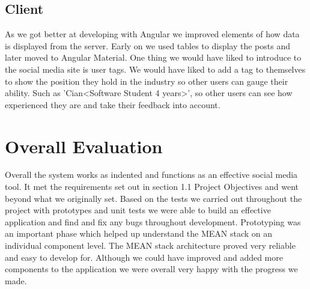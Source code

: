 \subsection{Client}
As we got better at developing with Angular we improved elements of how data is displayed from the server. Early on we used tables to display the posts and later moved to Angular Material. One thing we would have liked to introduce to the social media site is user tags. We would have liked to add a tag to themselves to show the position they hold in the industry so other users can gauge their ability. Such as 'Cian<Software Student 4 years>', so other users can see how experienced they are and take their feedback into account.


\section{Overall Evaluation}
Overall the system works as indented and functions as an effective social media tool. It met the requirements set out in section 1.1 Project Objectives and went beyond what we originally set. Based on the tests we carried out throughout the project with prototypes and unit tests we were able to build an effective application and find and fix any bugs throughout development. Prototyping was an important phase which helped up understand the MEAN stack on an individual component level. The MEAN stack architecture proved very reliable and easy to develop for. Although we could have improved and added more components to the application we were overall very happy with the progress we made.
